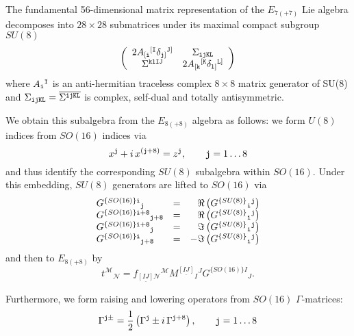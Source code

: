 \documentclass[a4paper,12pt]{article}
\begin{document}
The fundamental 56-dimensional matrix representation of the
$E_{7(+7)}$ Lie algebra decomposes into $28\times28$ submatrices
under its maximal compact subgroup $SU(8)$
\begin{equation}
\left(\begin{array}{cc}
2A_{[{\tt i}}{}^{[{\tt I}}\delta_{{\tt j}]}{}^{{\tt J}]}&\Sigma_{\tt ijKL}\\
\Sigma^{\tt klIJ}&2A_{[{\tt k}}{}^{[{\tt K}}\delta_{{\tt l}]}{}^{{\tt L}]}
\end{array}\right)
\end{equation}
%
where $A_{\tt i}{}^{\tt I}$ is an anti-hermitian traceless complex
$8\times8$ matrix generator of SU(8) and
$\Sigma_{\tt ijKL}=\overline{\Sigma^{\tt ijKL}}$
is complex, self-dual and totally antisymmetric.

We obtain this subalgebra from the $E_{8(+8)}$ algebra as follows: we
form $U(8)$ indices from $SO(16)$ indices via 
\begin{equation}
x^{\tt j}+i\,x^{({\tt j}+8)}=z^{\tt j},\qquad {\tt j}=1\ldots8
\end{equation}
and thus identify the corresponding $SU(8)$ subalgebra within
$SO(16)$. Under this embedding, $SU(8)$ generators are lifted to
$SO(16)$ via
\begin{equation}
\begin{array}{lll}
G^{\{SO(16)\}\tt i}{}_{\tt j}&=&\phantom+\Re\left(G^{\{SU(8)\}}{}_{\tt i}{}^{\tt j}\right)\\
G^{\{SO(16)\}\tt i+8}{}_{\tt j+8}&=&\phantom+\Re\left(G^{\{SU(8)\}}{}_{\tt i}{}^{\tt j}\right)\\
G^{\{SO(16)\}\tt i+8}{}_{\tt j}&=&\phantom+\Im\left(G^{\{SU(8)\}}{}_{\tt i}{}^{\tt j}\right)\\
G^{\{SO(16)\}\tt i}{}_{\tt j+8}&=&-\Im\left(G^{\{SU(8)\}}{}_{\tt i}{}^{\tt j}\right)
\end{array}
\end{equation}
and then to $E_{8(+8)}$ by
\begin{equation}
t^{\mathcal M}{}_{\mathcal N} = f_{\underline{[IJ]}\mathcal{N}}{}^{\mathcal{M}} M^{\underline{[IJ]}}{}_{I}{}^{J}G^{\{SO(16)\}I}{}_{J}.
\end{equation}

Furthermore, we form raising and lowering operators from
$SO(16)$ $\Gamma$-matrices:
\begin{equation}
\Gamma^{{\tt j}\pm}=\frac{1}{2}\left(\Gamma^{\tt j}\pm i\,\Gamma^{{\tt j}+8}\right),\qquad {\tt j}=1\ldots8
\end{equation}
\end{document}
